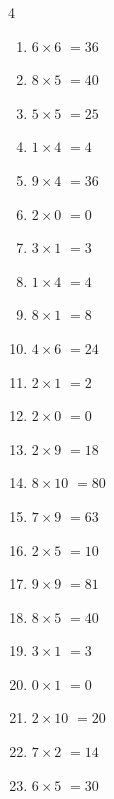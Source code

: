 \begin{multicols}{4}
\begin{enumerate}
  \item $6\times 6$
        $=36$

  \item $8\times 5$
        $=40$

  \item $5\times 5$
        $=25$

  \item $1\times 4$
        $=4$

  \item $9\times 4$
        $=36$

  \item $2\times 0$
        $=0$

  \item $3\times 1$
        $=3$

  \item $1\times 4$
        $=4$

  \item $8\times 1$
        $=8$

  \item $4\times 6$
        $=24$

  \item $2\times 1$
        $=2$

  \item $2\times 0$
        $=0$

  \item $2\times 9$
        $=18$

  \item $8\times 10$
        $=80$

  \item $7\times 9$
        $=63$

  \item $2\times 5$
        $=10$

\columnbreak %

  \item $9\times 9$
        $=81$

  \item $8\times 5$
        $=40$

  \item $3\times 1$
        $=3$

  \item $0\times 1$
        $=0$

  \item $2\times 10$
        $=20$

  \item $7\times 2$
        $=14$

  \item $6\times 5$
        $=30$


\end{enumerate}
\end{multicols}
